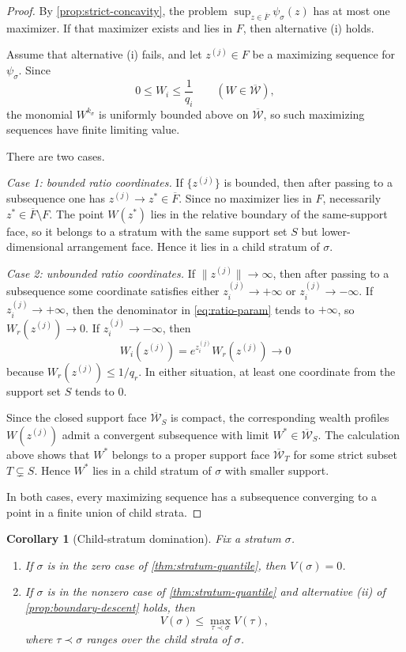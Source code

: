 \documentclass[11pt]{article}
\newtheorem{corollary}[corollary]{Corollary}
\theoremstyle{definition}
\newcommand{\1}{\mathbf{1}}
\begin{document}
\begin{proof}
By \cref{prop:strict-concavity}, the problem $\sup_{z\in \overline F}\psi_\sigma(z)$ has at most one maximizer. If that maximizer exists and lies in $F$, then alternative (i) holds.

Assume that alternative (i) fails, and let $z^{(j)}\in F$ be a maximizing sequence for $\psi_\sigma$. Since
\[
0\le W_i\le \frac{1}{q_i}
\qquad (W\in\overline{\mathcal W}),
\]
the monomial $W^{k_\sigma}$ is uniformly bounded above on $\overline{\mathcal W}$, so such maximizing sequences have finite limiting value.

There are two cases.

\smallskip
\noindent\emph{Case 1: bounded ratio coordinates.}
If $\{z^{(j)}\}$ is bounded, then after passing to a subsequence one has $z^{(j)}\to z^*\in\overline F$. Since no maximizer lies in $F$, necessarily $z^*\in\overline F\setminus F$. The point $W(z^*)$ lies in the relative boundary of the same-support face, so it belongs to a stratum with the same support set $S$ but lower-dimensional arrangement face. Hence it lies in a child stratum of $\sigma$.

\smallskip
\noindent\emph{Case 2: unbounded ratio coordinates.}
If $\|z^{(j)}\|\to\infty$, then after passing to a subsequence some coordinate satisfies either $z_i^{(j)}\to+\infty$ or $z_i^{(j)}\to-\infty$. If $z_i^{(j)}\to+\infty$, then the denominator in \eqref{eq:ratio-param} tends to $+\infty$, so $W_r(z^{(j)})\to 0$. If $z_i^{(j)}\to-\infty$, then
\[
W_i(z^{(j)})=e^{z_i^{(j)}}W_r(z^{(j)})\to 0
\]
because $W_r(z^{(j)})\le 1/q_r$. In either situation, at least one coordinate from the support set $S$ tends to $0$.

Since the closed support face $\overline{\mathcal W}_S$ is compact, the corresponding wealth profiles $W(z^{(j)})$ admit a convergent subsequence with limit $W^*\in\overline{\mathcal W}_S$. The calculation above shows that $W^*$ belongs to a proper support face $\overline{\mathcal W}_T$ for some strict subset $T\subsetneq S$. Hence $W^*$ lies in a child stratum of $\sigma$ with smaller support.

In both cases, every maximizing sequence has a subsequence converging to a point in a finite union of child strata.
\end{proof}

\begin{corollary}[Child-stratum domination]\label{cor:child-domination}
Fix a stratum $\sigma$.
\begin{enumerate}[label=(\alph*), itemsep=3pt]
  \item If $\sigma$ is in the zero case of \cref{thm:stratum-quantile}, then $V(\sigma)=0$.
  \item If $\sigma$ is in the nonzero case of \cref{thm:stratum-quantile} and alternative \emph{(ii)} of \cref{prop:boundary-descent} holds, then
  \[
  V(\sigma)\le \max_{\tau\prec\sigma} V(\tau),
  \]
  where $\tau\prec\sigma$ ranges over the child strata of $\sigma$.
\end{enumerate}
\end{corollary}
\end{document}
